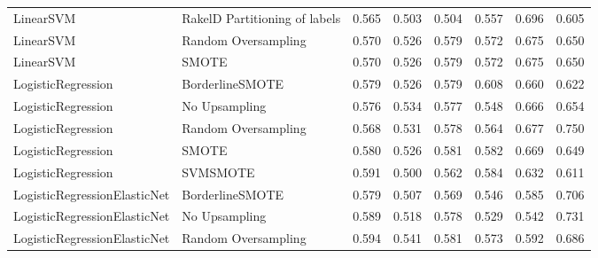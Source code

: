 \begin{tabular}{llllllll}
                      LinearSVM & RakelD Partitioning of labels & 0.565 &                     0.503 &                 0.504 &                  0.557 &                                   0.696 &     0.605 \\
                      LinearSVM &           Random Oversampling & 0.570 &                     0.526 &                 0.579 &                  0.572 &                                   0.675 &     0.650 \\
                      LinearSVM &                         SMOTE & 0.570 &                     0.526 &                 0.579 &                  0.572 &                                   0.675 &     0.650 \\
             LogisticRegression &               BorderlineSMOTE & 0.579 &                     0.526 &                 0.579 &                  0.608 &                                   0.660 &     0.622 \\
             LogisticRegression &                 No Upsampling & 0.576 &                     0.534 &                 0.577 &                  0.548 &                                   0.666 &     0.654 \\
             LogisticRegression &           Random Oversampling & 0.568 &                     0.531 &                 0.578 &                  0.564 &                                   0.677 &     0.750 \\
             LogisticRegression &                         SMOTE & 0.580 &                     0.526 &                 0.581 &                  0.582 &                                   0.669 &     0.649 \\
             LogisticRegression &                      SVMSMOTE & 0.591 &                     0.500 &                 0.562 &                  0.584 &                                   0.632 &     0.611 \\
   LogisticRegressionElasticNet &               BorderlineSMOTE & 0.579 &                     0.507 &                 0.569 &                  0.546 &                                   0.585 &     0.706 \\
   LogisticRegressionElasticNet &                 No Upsampling & 0.589 &                     0.518 &                 0.578 &                  0.529 &                                   0.542 &     0.731 \\
   LogisticRegressionElasticNet &           Random Oversampling & 0.594 &                     0.541 &                 0.581 &                  0.573 &                                   0.592 &     0.686 \\

\end{tabular}
